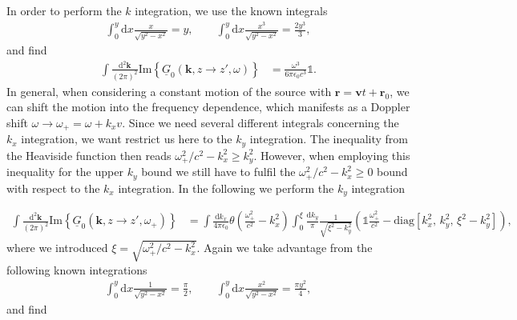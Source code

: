 \documentclass[11pt]{article}
\newcommand{\vv}[1]{\mathbf{#1}}
\newcommand{\dd}[0]{\mathrm{d}}
\begin{document}
%
In order to perform the $k$ integration, we use the known integrals
\begin{align}
  \int_0^y \dd x \frac{x}{\sqrt{y^2-x^2}}=y,
 \quad \quad
  \int_0^y \dd x \frac{x^3}{\sqrt{y^2-x^2}}=\frac{2y^3}{3},
  \end{align}
  and find
\begin{align}
  \int \frac{\dd^2\vv k}{(2\pi)^2} 
  \mathrm{Im}\left\{\underline{G}_0(\vv k, z\to z',\omega)\right\} &=
     \frac{\omega^3}{6\pi\epsilon_0 c^3}
     \mathbb{1}
     .
\end{align}
In general, when considering a constant motion of the source with $\vv r = \vv v t +\vv r_0$, we can shift the motion into the frequency dependence, which manifests as a Doppler shift $\omega\to\omega_+=\omega+k_x v$. Since we need several different integrals concerning the $k_x$ integration, we want restrict us here to the $k_y$ integration. The inequality from the Heaviside function then reads $\omega_+^2/c^2-k_x^2\geq k_y^2$. However, when employing this inequality for the upper $k_y$ bound we still have to fulfil the $\omega_+^2/c^2-k_x^2\geq 0$ bound with respect to the $k_x$ integration. In the following we perform the $k_y$ integration

\begin{align}
  \int\frac{\dd^2\vv k}{(2\pi)^2}  \mathrm{Im}\left\{\underline{G}_0(\vv k, z\to z',\omega_+)\right\} &=
  \int\frac{\dd k_x}{4\pi\epsilon_0} 
  \theta(\frac{\omega_+^2}{c^2}-k_x^2)
  \int_0^{\xi} \frac{\dd k_y}{\pi}
  \frac{1
}{\sqrt{\xi^2-k_y^2}}
  \left(
  \mathbb{1}\frac{\omega_+^2}{c^2} -
    \mathrm{diag}\left[
      k_x^2,\,k_y^2,\,\xi^2-k_y^2
    \right]
  \right)
  ,
\end{align}
where we introduced $\xi=\sqrt{\omega_+^2/c^2-k_x^2}$. Again we take advantage from the following known integrations
\begin{align}
  \int_0^y \dd x \frac{1}{\sqrt{y^2-x^2}}=\frac{\pi}{2},
 \quad \quad
  \int_0^y \dd x \frac{x^2}{\sqrt{y^2-x^2}}=\frac{\pi y^2}{4},
  \end{align}
  and find
\end{document}
